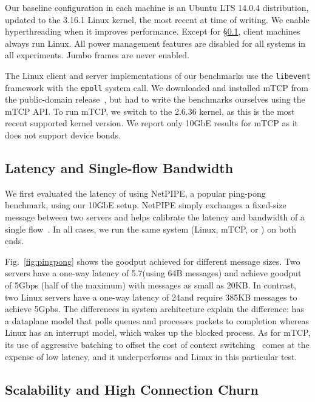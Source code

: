 Our baseline configuration in each
machine is an Ubuntu LTS 14.0.4 distribution, updated to the 3.16.1 Linux kernel, the most
recent at time of writing.
We enable hyperthreading when it improves performance. Except for
\S\ref{sec:eval:netpipe}, client machines always run Linux. All power
management features are disabled for all systems in all
experiments. Jumbo frames are never enabled.


The Linux client and server implementations of our benchmarks use the
\texttt{libevent} framework with the \texttt{epoll} system call.  We
downloaded and installed mTCP from the public-domain
release~\cite{url:mtcp}, but had to write the benchmarks ourselves
using the mTCP API.  To run mTCP, we switch to the 2.6.36 kernel, as
this is the most recent supported kernel version.  We report only
10GbE results for mTCP as it does not support device bonds.


\subsection{Latency and Single-flow Bandwidth}
\label{sec:eval:netpipe}

We first evaluated the latency of \ix using NetPIPE, a popular
ping-pong benchmark, using our 10GbE setup.  NetPIPE simply exchanges
a fixed-size message between two servers and helps calibrate the
latency and bandwidth of a single flow~\cite{snell1996netpipe}.  In
all cases, we run the same system (Linux, mTCP, or \ix) on both ends.

Fig.~\ref{fig:pingpong} shows the goodput achieved for different
message sizes.  Two \ix servers have a one-way latency of
5.7\microsecond (using 64B messages) and achieve goodput of 5Gbps
(half of the maximum) with messages as small as 20KB. In contrast, two
Linux servers have a one-way latency of 24\microsecond and require
385KB messages to achieve 5Gpbs.  The differences in system
architecture explain the difference: \ix has a dataplane model that
polls queues and processes packets to completion whereas Linux has an
interrupt model, which wakes up the blocked process.  
As for mTCP, its use of aggressive batching to offset the cost of
context switching~\cite{jeong2014mtcp} comes at the expense of low
latency, and it underperforms \ix and Linux in this particular test.




\subsection{Scalability and High Connection Churn}
\label{sec:eval:short}




